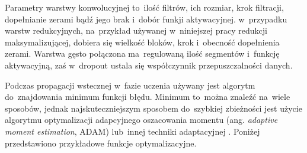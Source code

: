 {\parindent0pt %
Parametry warstwy konwolucyjnej to~ilość filtrów, ich rozmiar, krok filtracji, dopełnianie zerami bądź jego brak i~dobór funkji aktywacyjnej. w~przypadku warstw redukcyjnych, na~przykład używanej w~niniejszej pracy redukcji maksymalizującej, dobiera się wielkość bloków, krok i~obecność dopełnienia zerami. Warstwa gęsto połączona ma~regulowaną ilość segmentów i~funkcję aktywacyjną, zaś w~dropout ustala się współczynnik przepuszczalności danych.

Podczas propagacji wstecznej w~fazie uczenia używany jest algorytm do~znajdowania minimum funkcji błędu. Minimum to~można znaleźć na~wiele sposobów, jednak najskuteczniejszym sposobem do~szybkiej zbieżności jest użycie algorytmu optymalizacji adapcyjnego oszacowania momentu (ang. \textit{adaptive moment estimation}, ADAM) lub~innej techniki adaptacyjnej \cite{gradient_decent}. Poniżej przedstawiono przykładowe funkcje optymalizacyjne.

}
